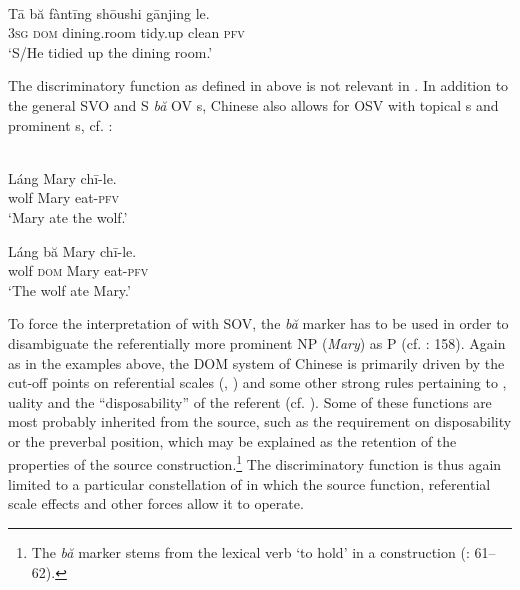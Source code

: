 \documentclass[output=paper]{langsci/langscibook}
\begin{document}
\ea \label{ex:serzant:20}
\\
\gll Tā   bă   fàntīng   shōushi   gānjing le.\\
     \textsc{3sg}  \textsc{dom}  dining.room   tidy.up   clean   \textsc{pfv}\\
\glt ‘S/He tidied up the dining room.’
\z

The discriminatory function as defined in  above is not relevant in . In addition to the general SVO and S \textit{bă} OV s, Chinese also allows for OSV with topical s and prominent s, cf. :

\ea\label{ex:serzant:21}
\\
\ea
\gll Láng   Mary   chī-le.\\
     wolf  Mary  eat-\textsc{pfv}\\
\glt ‘Mary ate the wolf.’

\ex
\gll Láng bă   Mary   chī-le.\\
     wolf \textsc{dom}   Mary  eat-\textsc{pfv}\\
\glt ‘The wolf ate Mary.’
\z
\z

To force the interpretation of  with SOV, the \textit{bă} marker has to be used in order to disambiguate the referentially more prominent NP (\textit{Mary}) as P (cf. \citealt{Bisang1992}: 158). Again as in the examples above, the DOM system of Chinese is primarily driven by the cut-off points on referential scales (, ) and some other strong rules pertaining to , uality and the “disposability” of the  referent (cf. \citealt{LiThompson1981}). Some of these functions are most probably inherited from the source, such as the requirement on disposability or the preverbal position, which may be explained as the retention of the properties of the source construction.\footnote{The \textit{bă} marker stems from the lexical verb ‘to hold’ in a  construction (\citealt{Sun1996}: 61–62).}  The discriminatory function is thus again limited to a particular constellation of  in which the source function, referential scale effects and other forces allow it to operate.
\end{document}
